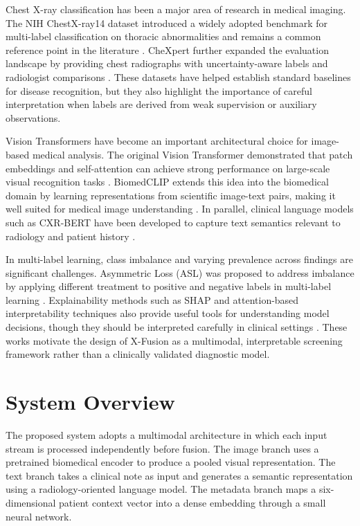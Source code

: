 \documentclass[conference,a4paper]{IEEEtran}
\begin{document}
Chest X-ray classification has been a major area of research in medical imaging. The NIH ChestX-ray14 dataset introduced a widely adopted benchmark for multi-label classification on thoracic abnormalities and remains a common reference point in the literature \cite{wang2017}. CheXpert further expanded the evaluation landscape by providing chest radiographs with uncertainty-aware labels and radiologist comparisons \cite{irvin2019}. These datasets have helped establish standard baselines for disease recognition, but they also highlight the importance of careful interpretation when labels are derived from weak supervision or auxiliary observations.

Vision Transformers have become an important architectural choice for image-based medical analysis. The original Vision Transformer demonstrated that patch embeddings and self-attention can achieve strong performance on large-scale visual recognition tasks \cite{dosovitskiy2021}. BiomedCLIP extends this idea into the biomedical domain by learning representations from scientific image-text pairs, making it well suited for medical image understanding \cite{biomedclip2023}. In parallel, clinical language models such as CXR-BERT have been developed to capture text semantics relevant to radiology and patient history \cite{cxrbert2022}.

In multi-label learning, class imbalance and varying prevalence across findings are significant challenges. Asymmetric Loss (ASL) was proposed to address imbalance by applying different treatment to positive and negative labels in multi-label learning \cite{ridnik2021}. Explainability methods such as SHAP and attention-based interpretability techniques also provide useful tools for understanding model decisions, though they should be interpreted carefully in clinical settings \cite{lundberg2017,chefer2021}. These works motivate the design of X-Fusion as a multimodal, interpretable screening framework rather than a clinically validated diagnostic model.

\section{System Overview}

The proposed system adopts a multimodal architecture in which each input stream is processed independently before fusion. The image branch uses a pretrained biomedical encoder to produce a pooled visual representation. The text branch takes a clinical note as input and generates a semantic representation using a radiology-oriented language model. The metadata branch maps a six-dimensional patient context vector into a dense embedding through a small neural network.
\end{document}
